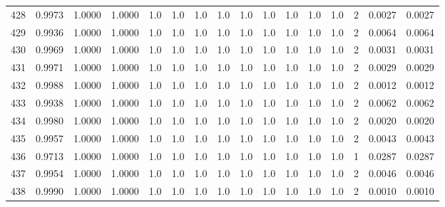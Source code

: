 \begin{tabular}{lrrrrrrrrrrrrrrr}
428 &      0.9973 &  1.0000 &  1.0000 &     1.0 &     1.0 &     1.0 &     1.0 &     1.0 &     1.0 &     1.0 &      1.0 &        1.0 &      2 &                    0.0027 &                     0.0027 \\
429 &      0.9936 &  1.0000 &  1.0000 &     1.0 &     1.0 &     1.0 &     1.0 &     1.0 &     1.0 &     1.0 &      1.0 &        1.0 &      2 &                    0.0064 &                     0.0064 \\
430 &      0.9969 &  1.0000 &  1.0000 &     1.0 &     1.0 &     1.0 &     1.0 &     1.0 &     1.0 &     1.0 &      1.0 &        1.0 &      2 &                    0.0031 &                     0.0031 \\
431 &      0.9971 &  1.0000 &  1.0000 &     1.0 &     1.0 &     1.0 &     1.0 &     1.0 &     1.0 &     1.0 &      1.0 &        1.0 &      2 &                    0.0029 &                     0.0029 \\
432 &      0.9988 &  1.0000 &  1.0000 &     1.0 &     1.0 &     1.0 &     1.0 &     1.0 &     1.0 &     1.0 &      1.0 &        1.0 &      2 &                    0.0012 &                     0.0012 \\
433 &      0.9938 &  1.0000 &  1.0000 &     1.0 &     1.0 &     1.0 &     1.0 &     1.0 &     1.0 &     1.0 &      1.0 &        1.0 &      2 &                    0.0062 &                     0.0062 \\
434 &      0.9980 &  1.0000 &  1.0000 &     1.0 &     1.0 &     1.0 &     1.0 &     1.0 &     1.0 &     1.0 &      1.0 &        1.0 &      2 &                    0.0020 &                     0.0020 \\
435 &      0.9957 &  1.0000 &  1.0000 &     1.0 &     1.0 &     1.0 &     1.0 &     1.0 &     1.0 &     1.0 &      1.0 &        1.0 &      2 &                    0.0043 &                     0.0043 \\
436 &      0.9713 &  1.0000 &  1.0000 &     1.0 &     1.0 &     1.0 &     1.0 &     1.0 &     1.0 &     1.0 &      1.0 &        1.0 &      1 &                    0.0287 &                     0.0287 \\
437 &      0.9954 &  1.0000 &  1.0000 &     1.0 &     1.0 &     1.0 &     1.0 &     1.0 &     1.0 &     1.0 &      1.0 &        1.0 &      2 &                    0.0046 &                     0.0046 \\
438 &      0.9990 &  1.0000 &  1.0000 &     1.0 &     1.0 &     1.0 &     1.0 &     1.0 &     1.0 &     1.0 &      1.0 &        1.0 &      2 &                    0.0010 &                     0.0010 \\

\end{tabular}
